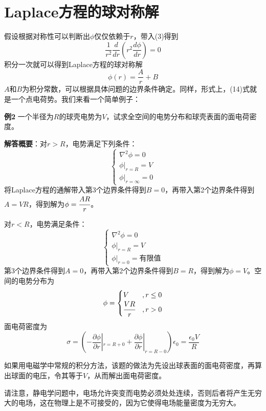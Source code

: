 \documentclass[a4paper,10pt]{ctexart}
\begin{document}
\section{Laplace方程的球对称解}
假设根据对称性可以判断出$\phi$仅仅依赖于$r$，带入(3)得到
\begin{equation}
\frac{1}{r^2} \frac{d}{dr}(r^2 \frac{d\phi}{dr})=0
\end{equation}
积分一次就可以得到Laplace方程的球对称解
\begin{equation}
\phi(r) = \frac{A}{r} + B
\end{equation}
$A$和$B$为积分常数，可以根据具体问题的边界条件确定。同样，形式上，(14)式就是一个点电荷势。我们来看一个简单例子：\par
\textbf{例2} 一个半径为$R$的球壳电势为$V$，试求全空间的电势分布和球壳表面的面电荷密度。\par
\textbf{解答概要}：对$r>R$，电势满足下列条件：
\begin{equation}
\begin{cases}
\nabla^2 \phi = 0 \\
\phi |_{r=R} =V \\
\phi |_{r=\infty} = 0 
\end{cases}
\end{equation}
将Laplace方程的通解带入第3个边界条件得到$B=0$，再带入第2个边界条件得到$A=VR$，得到解为$\phi = \cfrac{AR}{r}$。\par
对$r<R$，电势满足条件：
\begin{equation}
\begin{cases}
\nabla^2 \phi = 0 \\
\phi |_{r=R} =V \\
\phi |_{r=0} = \text{有限值}
\end{cases}
\end{equation}
第3个边界条件得到$A=0$，再带入第2个边界条件得到$B=R$，得到解为$\phi = V$。空间的电势分布为
\begin{equation}
\phi = \begin{cases} V&, r \le 0 \\
\cfrac{VR}{r}&, r>0
\end{cases}
\end{equation}
面电荷密度为
\begin{equation}
\sigma = (-\frac{\partial \phi}{\partial r}|_{r=R+0} + \frac{\partial \phi}{\partial r}|_{r=R-0})\epsilon_0 = \frac{\epsilon_0 V}{ R}
\end{equation}
\par
如果用电磁学中常规的积分方法，该题的做法为先设出球表面的面电荷密度，再算出球面的电压，令其等于$V$，从而解出面电荷密度。\par
请注意，静电学问题中，电场允许突变而电势必须处处连续，否则后者将产生无穷大的电场，这在物理上是不可接受的，因为它使得电场能量密度为无穷大。
\end{document}
